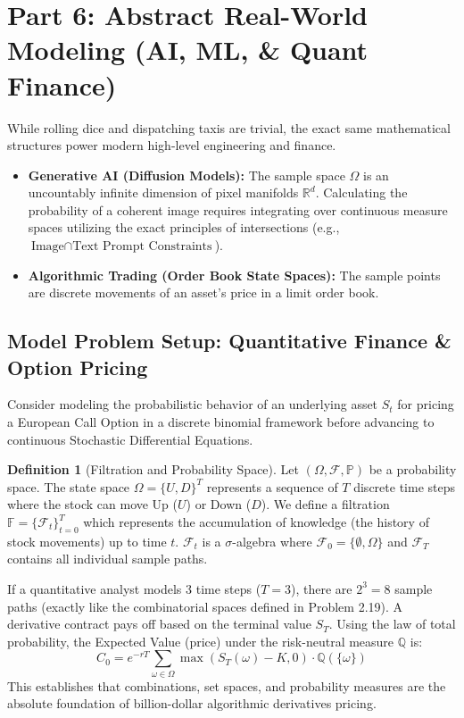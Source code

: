 \documentclass[11pt, letterpaper]{article}
\theoremstyle{definition}
\newtheorem{definition}{Definition}[section]
\theoremstyle{remark}
\begin{document}
\section{Part 6: Abstract Real-World Modeling (AI, ML, \& Quant Finance)}

While rolling dice and dispatching taxis are trivial, the exact same mathematical structures power modern high-level engineering and finance.
\begin{itemize}
    \item \textbf{Generative AI (Diffusion Models):} The sample space $\Omega$ is an uncountably infinite dimension of pixel manifolds $\mathbb{R}^{d}$. Calculating the probability of a coherent image requires integrating over continuous measure spaces utilizing the exact principles of intersections (e.g., $\text{Image} \cap \text{Text Prompt Constraints}$).
    \item \textbf{Algorithmic Trading (Order Book State Spaces):} The sample points are discrete movements of an asset's price in a limit order book.
\end{itemize}

\subsection{Model Problem Setup: Quantitative Finance \& Option Pricing}
Consider modeling the probabilistic behavior of an underlying asset $S_{t}$ for pricing a European Call Option in a discrete binomial framework before advancing to continuous Stochastic Differential Equations.
\begin{definition}[Filtration and Probability Space]
Let $(\Omega, \mathscr{F}, \mathbb{P})$ be a probability space. The state space $\Omega = \{U, D\}^{T}$ represents a sequence of $T$ discrete time steps where the stock can move Up ($U$) or Down ($D$). We define a filtration $\mathbb{F} = \{\mathscr{F}_{t}\}_{t=0}^{T}$ which represents the accumulation of knowledge (the history of stock movements) up to time $t$. $\mathscr{F}_{t}$ is a $\sigma$-algebra where $\mathscr{F}_{0} = \{\emptyset, \Omega\}$ and $\mathscr{F}_{T}$ contains all individual sample paths.
\end{definition}

If a quantitative analyst models 3 time steps ($T=3$), there are $2^{3} = 8$ sample paths (exactly like the combinatorial spaces defined in Problem 2.19). A derivative contract pays off based on the terminal value $S_{T}$. Using the law of total probability, the Expected Value (price) under the risk-neutral measure $\mathbb{Q}$ is:
\[ C_0 = e^{-rT} \sum_{\omega \in \Omega} \max(S_T(\omega) - K, 0) \cdot \mathbb{Q}(\{\omega\}) \]
This establishes that combinations, set spaces, and probability measures are the absolute foundation of billion-dollar algorithmic derivatives pricing.
\end{document}
